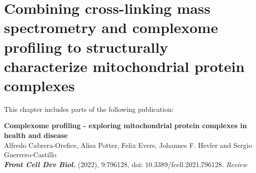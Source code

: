 \chapter{Combining cross-linking mass spectrometry and complexome profiling to structurally characterize mitochondrial protein complexes} \label{ch-1}

This chapter includes parts of the following publication:

\begin{flushleft}
\textbf{Complexome profiling - exploring mitochondrial protein complexes in health and disease}\\

\footnotesize
\vspace{0.3cm}
Alfredo Cabrera-Orefice, Alisa Potter, Felix Evers, Johannes F. Hevler and Sergio Guerrero-Castillo \\
\vspace{0.3cm}
\textbf{\emph{Front Cell Dev Biol.}} (2022), 9:796128, doi: 10.3389/fcell.2021.796128. \emph{Review}\\
\end{flushleft}
\newpage

